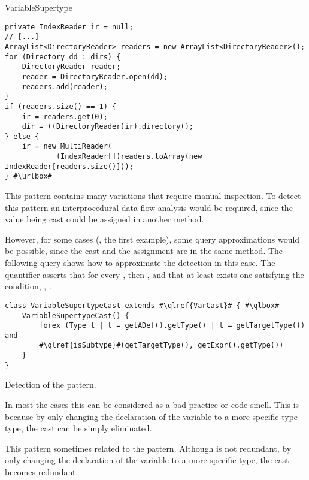 \begin{pattern}{VariableSupertype}
\begin{verbatim}
private IndexReader ir = null;  
// [...]
ArrayList<DirectoryReader> readers = new ArrayList<DirectoryReader>();
for (Directory dd : dirs) {
    DirectoryReader reader;        
    reader = DirectoryReader.open(dd);
    readers.add(reader);
}
if (readers.size() == 1) {
    ir = readers.get(0);
    dir = ((DirectoryReader)ir).directory();
} else {
    ir = new MultiReader(
            (IndexReader[])readers.toArray(new IndexReader[readers.size()]));
} #\urlbox#
\end{verbatim}


\detection{}
This pattern contains many variations that require manual inspection.
To detect this pattern an interprocedural data-flow analysis would be required,
since the value being cast could be assigned in another method.

However, for some cases (\eg{}, the first example),
some query approximations would be possible,
since the cast and the assignment are in the same method.
The following query shows how to approximate the detection in this case.
The  quantifier asserts that for every ,
then ,
and that at least exists one  satisfying the condition,
\ie{}, .

\begin{listing}
\begin{verbatim}
class VariableSupertypeCast extends #\qlref{VarCast}# { #\qlbox#
	VariableSupertypeCast() {
		forex (Type t | t = getADef().getType() | t = getTargetType()) and
		#\qlref{isSubtype}#(getTargetType(), getExpr().getType())
	}
}
\end{verbatim}
\caption{Detection of the \thisp{} pattern.}
\label{lst:ql:VariableSupertype}
\end{listing}


\issues{}
In most the cases this can be considered as a bad practice or code smell.
This is because by only changing the declaration of the variable
to a more specific type type, the cast can be simply eliminated.

This pattern sometimes related to the  pattern.
Although \thisp{} is not redundant,
by only changing the declaration of the variable to a more specific type,
the cast becomes redundant.

\end{pattern}
